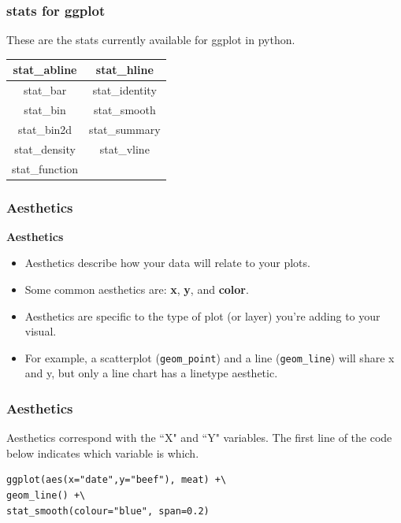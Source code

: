 \documentclass{beamer}
\begin{document}
\begin{frame}
	\frametitle{stats for ggplot}
	\Large
	These are the stats currently available for ggplot in python.\\
	\bigskip
	\begin{center}
	\begin{tabular}{|c|c|}\hline
	stat\_abline	&	stat\_hline	\\ \hline
	stat\_bar	&	stat\_identity	\\ \hline
	stat\_bin	&	stat\_smooth	\\ \hline
	stat\_bin2d	&	stat\_summary	\\ \hline
	stat\_density	&	stat\_vline	\\ \hline
	stat\_function	&		\\ \hline
	\end{tabular} 
	\end{center}
\end{frame}
\begin{frame}[fragile]
	\frametitle{Aesthetics}
	\Large
	\noindent \textbf{Aesthetics}
	\begin{itemize}
		\item Aesthetics describe how your data will relate to your plots.
		\item Some common aesthetics are: \textbf{x}, \textbf{y}, and \textbf{color}. \item Aesthetics are specific to the type of plot (or layer) you're adding to your visual. 
		\item For example, a scatterplot (\texttt{geom\_point}) and a line (\texttt{geom\_line}) will share x and y, but only a line chart has a linetype aesthetic.
	\end{itemize}
	
	
\end{frame}
\begin{frame}[fragile]
	\frametitle{Aesthetics}
	\Large
Aesthetics correspond with the ``X" and ``Y" variables. The first line of the code below indicates which variable is which.
\begin{framed}
\begin{verbatim}
ggplot(aes(x="date",y="beef"), meat) +\
geom_line() +\
stat_smooth(colour="blue", span=0.2)
\end{verbatim}
\end{framed}

\end{frame}
\end{document}
